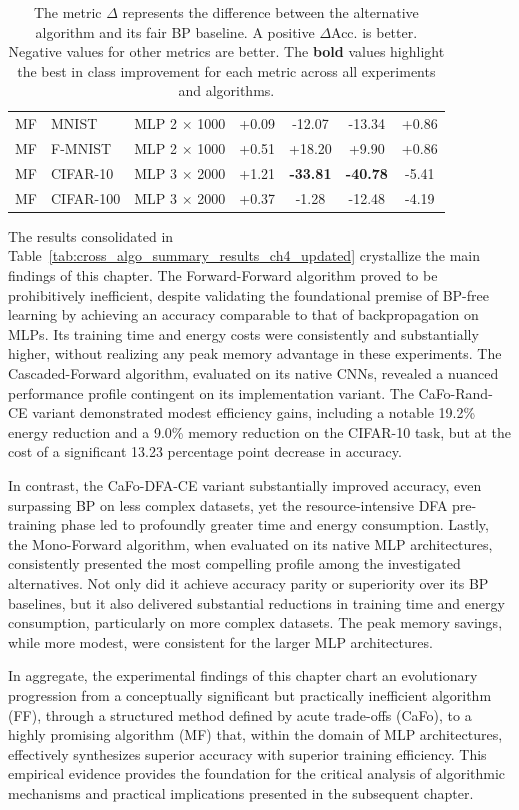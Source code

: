\begin{table}[t!]
{\begin{tabular}{>{\centering\arraybackslash}m{3.2cm} l >{\centering\arraybackslash}m{2.8cm} S S S S}
        \midrule
        MF & MNIST & MLP 2 $\times$ 1000 & +0.09 & -12.07 & -13.34 & +0.86 \\
        MF  & F-MNIST & MLP 2 $\times$ 1000 & +0.51 & +18.20 & +9.90 & +0.86 \\
        MF  & CIFAR-10 & MLP 3 $\times$ 2000 & +1.21 & \bfseries -33.81 & \bfseries -40.78 & -5.41 \\
        MF  & CIFAR-100 & MLP 3 $\times$ 2000 & +0.37 & -1.28 & -12.48 & -4.19 \\
        \bottomrule
    \end{tabular}%
    }
    \caption*{\footnotesize The metric $\Delta$ represents the difference between the alternative algorithm and its fair BP baseline. A positive $\Delta$Acc. is better. Negative values for other metrics are better. The \textbf{bold} values highlight the best in class improvement for each metric across all experiments and algorithms.}
\end{table}

The results consolidated in Table~\ref{tab:cross_algo_summary_results_ch4_updated} crystallize the main findings of this chapter. The Forward-Forward algorithm proved to be prohibitively inefficient, despite validating the foundational premise of BP-free learning by achieving an accuracy comparable to that of backpropagation on MLPs. Its training time and energy costs were consistently and substantially higher, without realizing any peak memory advantage in these experiments. The Cascaded-Forward algorithm, evaluated on its native CNNs, revealed a nuanced performance profile contingent on its implementation variant. The CaFo-Rand-CE variant demonstrated modest efficiency gains, including a notable 19.2\% energy reduction and a 9.0\% memory reduction on the CIFAR-10 task, but at the cost of a significant 13.23 percentage point decrease in accuracy.

In contrast, the CaFo-DFA-CE variant substantially improved accuracy, even surpassing BP on less complex datasets, yet the resource-intensive DFA pre-training phase led to profoundly greater time and energy consumption. Lastly, the Mono-Forward algorithm, when evaluated on its native MLP architectures, consistently presented the most compelling profile among the investigated alternatives. Not only did it achieve accuracy parity or superiority over its BP baselines, but it also delivered substantial reductions in training time and energy consumption, particularly on more complex datasets. The peak memory savings, while more modest, were consistent for the larger MLP architectures.

In aggregate, the experimental findings of this chapter chart an evolutionary progression from a conceptually significant but practically inefficient algorithm (FF), through a structured method defined by acute trade-offs (CaFo), to a highly promising algorithm (MF) that, within the domain of MLP architectures, effectively synthesizes superior accuracy with superior training efficiency. This empirical evidence provides the foundation for the critical analysis of algorithmic mechanisms and practical implications presented in the subsequent chapter.